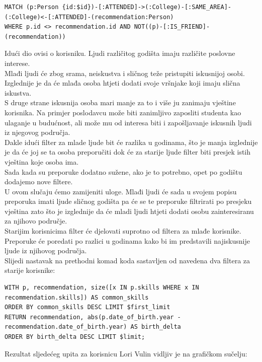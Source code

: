 \documentclass[titlepage, 12pt]{scrartcl}
\begin{document}
\begin{samepage}
\begin{verbatim}
MATCH (p:Person {id:$id})-[:ATTENDED]->(:College)-[:SAME_AREA]-
(:College)<-[:ATTENDED]-(recommendation:Person)
WHERE p.id <> recommendation.id AND NOT((p)-[:IS_FRIEND]-(recommendation))

\end{verbatim}
\end{samepage}
Idući dio ovisi o korisniku. Ljudi različitog godišta imaju različite poslovne interese. \\
Mlađi ljudi će zbog srama, neiskustva i sličnog teže pristupiti  iskusnijoj osobi. Izglednije je da će mlađa osoba htjeti dodati svoje vršnjake koji imaju slična iskustva. \\
S druge strane iskusnija osoba mari manje za to i više ju zanimaju vještine korisnika. Na primjer poslodavcu može biti zanimljivo zaposliti studenta kao ulaganje u budućnost, ali može mu od interesa biti i zapošljavanje iskusnih ljudi iz njegovog područja. \\
Dakle idući filter za mlade ljude bit će razlika u godinama, što je manja izglednije je da će joj se ta osoba preporučiti dok će za starije ljude filter biti presjek istih vještina koje osoba ima. \\
Sada kada su preporuke dodatno sužene, ako je to potrebno, opet po godištu dodajemo nove filtere. \\
U ovom slučaju ćemo zamijeniti uloge. Mlađi ljudi će sada u svojem popisu preporuka imati ljude sličnog godišta pa će se te preporuke filtrirati po presjeku vještina zato što je izglednije da će mladi ljudi htjeti dodati osobu zainteresiranu za njihovo područje. \\
Starijim korisnicima filter će djelovati suprotno od filtera za mlađe korisnike. Preporuke će poredati po razlici u godinama kako bi im predstavili najiskusnije ljude iz njihovog područja. \\
Slijedi nastavak na prethodni komad koda sastavljen od navedena dva filtera za starije korisnike:
\begin{samepage}
\begin{verbatim}
WITH p, recommendation, size([x IN p.skills WHERE x IN recommendation.skills]) AS common_skills 
ORDER BY common_skills DESC LIMIT $first_limit
RETURN recommendation, abs(p.date_of_birth.year - recommendation.date_of_birth.year) AS birth_delta 
ORDER BY birth_delta DESC LIMIT $limit;

\end{verbatim}
\end{samepage}
\newpage
Rezultat sljedećeg upita za korisnicu Lori Vulin vidljiv je na grafičkom sučelju:
\end{document}
